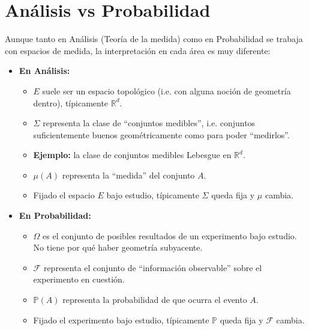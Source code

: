 \section{Análisis vs Probabilidad}
Aunque tanto en Análisis (Teoría de la medida) como en Probabilidad se trabaja con espacios de medida, la interpretación en cada área es muy diferente:

\begin{itemize}
    \item \textbf{En Análisis:}
        \begin{itemize}
            \item \(E\) suele ser un espacio topológico (i.e. con alguna noción de geometría dentro), típicamente \(\mathbb{R}^d\).

            \item \(\Sigma\) representa la clase de “conjuntos medibles”, i.e. conjuntos suficientemente buenos geométricamente como para poder “medirlos”. 

            \item \textbf{Ejemplo:} la clase de conjuntos medibles Lebesgue en \(\mathbb{R}^d\).

            \item \(\mu(A)\) representa la “medida” del conjunto \(A\). 

			\item Fijado el espacio \(E\) bajo estudio, típicamente \(\Sigma\) queda fija y \(\mu\) cambia.
        \end{itemize}
    
    \item \textbf{En Probabilidad:}
        \begin{itemize}
            \item \(\Omega\) es el conjunto de posibles resultados de un experimento bajo estudio. No tiene por qué haber geometría subyacente.

            \item \(\mathcal{F}\) representa el conjunto de “información observable” sobre el experimento en cuestión.

            \item \(\mathbb{P}(A)\) representa la probabilidad de que ocurra el evento \(A\). 

			\item Fijado el experimento bajo estudio, típicamente \(\mathbb{P}\) queda fija y \(\mathcal{F}\) cambia.
        \end{itemize}
\end{itemize}


